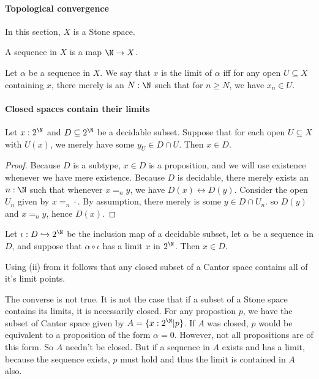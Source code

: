 \paragraph{Topological convergence}
In this section, $X$ is a Stone space. 
\begin{definition}
  A sequence in $X$ is a map $\N \to X$. 
\end{definition} 
\begin{definition}
  Let $\alpha$ be a sequence in $X$. 
  We say that $x$ is the limit of $\alpha$ iff 
  for any open $U\subseteq X$ containing $x$, 
  there merely is an $N:\N$ such that for $n \geq N$, we have
  $x_n \in U$. 
\end{definition}

\paragraph{Closed spaces contain their limits}
\begin{lemma}
  Let $x:2^\N$ and $D\subseteq 2^\N$ be a decidable subset. 
  Suppose that for each open $U\subseteq X$ with $U(x)$,
  we merely have some $y_U \in D \cap U$. 
  Then $x\in D$. 
\end{lemma}
\begin{proof}
  Because $D$ is a subtype, $x\in D$ is a proposition, and we will use existence whenever we have mere existence.
  Because $D$ is decidable, %
  there merely exists an $n:\N$ such that 
  whenever $x =_n y$, we have $D(x) \leftrightarrow D(y)$. 
  Consider the open $U_n$ given by $x =_n \cdot $.
  By assumption, there merely is some $y\in D\cap U_n$. 
  so $D(y)$ and $x =_n y$, hence $D(x)$.
\end{proof}
\begin{corollary}
  Let $\iota :D\hookrightarrow 2^\N$ be the inclusion map of a decidable subset, 
  let $\alpha$ be a sequence in $D$, and 
  suppose that $\alpha\circ \iota$ has a limit $x$ in $2^\N$. 
  Then $x\in D$. 
\end{corollary}
\begin{corollary}
  Using (ii) from  it follows that any 
  closed subset of a Cantor space contains all of it's limit points. 
\end{corollary}
\begin{remark}
  The converse is not true. It is not the case that if a subset of a Stone space 
  contains its limits, it is necessarily closed. 
  For any propostion $p$, we have the subset of Cantor space given by $A = \{x:2^\N | p\}$. 
  If $A$ was closed, $p$ would be equivalent to a proposition of the form $\alpha = 0$. 
  However, not all propositions are of this form. So $A$ needn't be closed. 
  But if a sequence in $A$ exists and has a limit, because the sequence exists, $p$ must hold and 
  thus the limit is contained in $A$ also. 
\end{remark}
